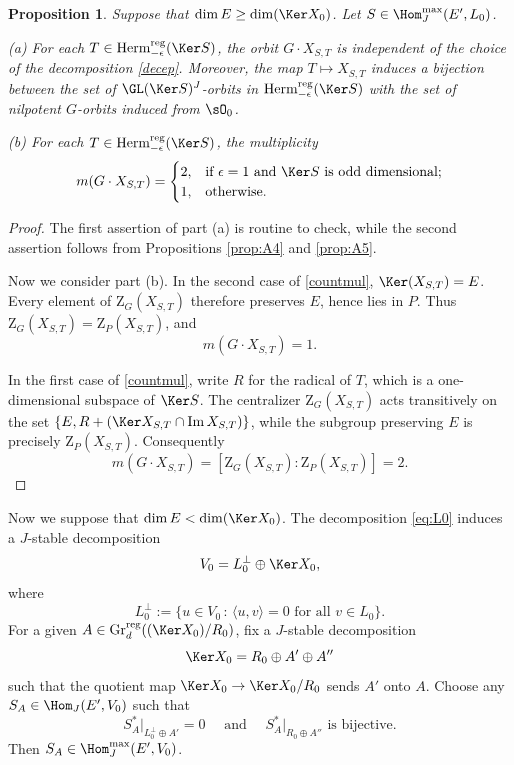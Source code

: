 \documentclass[11pt,a4paper]{amsart}
\def\Im{\operatorname{Im}}
\newcommand{\la}{\langle}
\newcommand{\be}{\begin {equation}}
\newcommand{\ee}{\end {equation}}
\numberwithin{equation}{section}
\newtheorem{prop}[thm]{Proposition}
\theoremstyle{remark}
\begin{document}
\begin{prop}\label{prop:A6}
Suppose that $\dim E \geq \dim (\Ker X_0)$. Let $S\in \Hom_J^{\max}(E',L_0)$. 

\noindent
(a) For each $T\in \mathrm{Herm}_{-\epsilon}^{\mathrm{reg}}(\Ker S)$, the orbit $G\cdot X_{S,T}$ is independent of the choice of the decomposition \eqref{decep}. Moreover, the  map $T\mapsto
 X_{S,T}$ induces a bijection between the set of  $\GL(\Ker S)^J$-orbits in $\mathrm{Herm}_{-\epsilon}^{\mathrm{reg}}(\Ker S)$ with the set of nilpotent $G$-orbits induced from $\sO_0$. 


\noindent
(b) For each $T\in \mathrm{Herm}_{-\epsilon}^{\mathrm{reg}}(\Ker S)$, the multiplicity  
\begin{equation}\label{countmul}
m(G\cdot X_{S,T})=
\begin{cases}
2, & \text{if $\epsilon = 1$ and $\Ker S$ is odd dimensional;}\\
1, & \text{otherwise}.
\end{cases}
\end{equation}
\end{prop}
\begin{proof}
The first assertion of part (a) is routine to check, while the second assertion  follows from Propositions \ref{prop:A4} and \ref{prop:A5}.

Now we consider part (b). 
In the second case of \eqref{countmul}, $\Ker (X_{S,T})=E$.  Every element of $\mathrm Z_G(X_{S,T})$ therefore preserves $E$, hence lies in $P$.  Thus $\mathrm Z_G(X_{S,T})=\mathrm Z_P(X_{S,T})$, and
\[
m(G\cdot X_{S,T})=1.
\]

In the first case of \eqref{countmul}, write $R$ for the radical of $T$, which is a  one-dimensional subspace of $\Ker S$. 
The centralizer $\mathrm Z_G(X_{S,T})$ acts transitively on the set $\{E,R + (\Ker X_{S,T}\cap \Im X_{S,T})\}$, while the subgroup preserving $E$ is precisely $\mathrm Z_P(X_{S,T})$. Consequently
\[
m(G\cdot X_{S,T})=[\mathrm Z_G(X_{S,T}):\mathrm Z_P(X_{S,T})]=2.
\]
\end{proof}

Now we suppose that $\dim E < \dim (\Ker X_0)$. 
The decomposition \eqref{eq:L0} induces a $J$-stable decomposition
\[
V_0 = L_0^\perp \oplus \Ker X_0,
\]
where 
\[
L_0^\perp:=\{u\in V_0\,:\, \la u, v\rangle=0 \textrm{ for all }v\in L_0\}.
\]
For a given $A\in \mathrm{Gr}^{\mathrm{reg}}_d((\Ker X_0)/R_0)$, fix a $J$-stable decomposition 
\be\label{decomaa}
\Ker X_0 = R_0 \oplus A' \oplus A''
\ee
such that the quotient map $\Ker X_0 \to \Ker X_0/R_0$ sends $A'$ onto $A$. 
Choose any $S_A\in \Hom_{J}(E',V_0)$ such that 
\be \label{chSA}
\textrm{$S_A^*|_{ L_0^\perp \oplus A' } = 0\quad$ and $\quad S_A^*|_{R_0\oplus A'' } $ is bijective.}
\ee
Then $S_A\in \Hom_J^{\max}(E',V_0)$.
\end{document}
